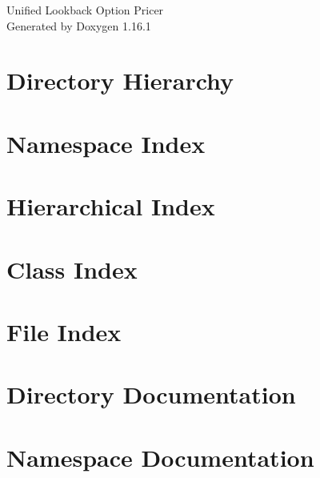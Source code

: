 \documentclass[twoside]{book}
\newcommand{\+}{\discretionary{\mbox{\scriptsize$\hookleftarrow$}}{}{}}
\newcommand{\clearemptydoublepage}{%
    \newpage{\pagestyle{empty}\cleardoublepage}%
  }
\begin{document}
  \raggedbottom
    \hypersetup{pageanchor=false,
                bookmarksnumbered=true,
                pdfencoding=unicode
               }
  \begin{titlepage}
  \vspace*{7cm}
  \begin{center}%
  {\Large Unified Lookback Option Pricer}\\
  \vspace*{1cm}
  {\large Generated by Doxygen 1.16.1}\\
  \end{center}
  \end{titlepage}
  \clearemptydoublepage
  \tableofcontents
  \clearemptydoublepage
  \hypersetup{pageanchor=true}

\chapter{Directory Hierarchy}

\chapter{Namespace Index}

\chapter{Hierarchical Index}

\chapter{Class Index}

\chapter{File Index}

\chapter{Directory Documentation}








\chapter{Namespace Documentation}




\end{document}
